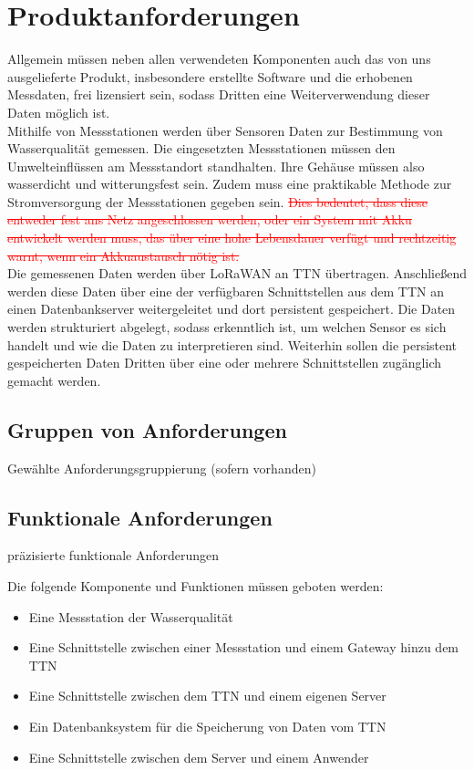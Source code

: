 \documentclass[
11pt,
a4paper,
ngerman,
]{article}
\newcommand{\commentKayo}[1]{\todo[size=\small,color=green!40,author=Kayo]{#1}}
\newcommand{\rem}[1]{\textcolor{red}{\sout{#1}}}
\newcommand{\descriptionWhat}[1]{%
	\begin{itshape}%
	#1 \\%
	\end{itshape}%
}
\begin{document}
\newpage

\section{Produktanforderungen}

Allgemein müssen neben allen verwendeten Komponenten auch das von uns ausgelieferte Produkt, insbesondere erstellte Software und die erhobenen Messdaten, frei lizensiert sein, sodass Dritten eine Weiterverwendung dieser Daten möglich ist.\\
Mithilfe von Messstationen werden über Sensoren Daten zur Bestimmung von Wasserqualität gemessen. Die eingesetzten Messstationen müssen den Umwelteinflüssen am Messstandort standhalten. Ihre Gehäuse müssen also wasserdicht und witterungsfest sein. Zudem muss eine praktikable Methode zur Stromversorgung der Messstationen gegeben sein. \commentKayo{Unnötig da wir das Festnetz benutzen}\rem{Dies bedeutet, dass diese entweder fest ans Netz angeschlossen werden, oder ein System mit Akku entwickelt werden muss, das über eine hohe Lebensdauer verfügt und rechtzeitig warnt, wenn ein Akkuaustausch nötig ist.}\\
Die gemessenen Daten werden über LoRaWAN an TTN übertragen. Anschließend werden diese Daten über eine der verfügbaren Schnittstellen aus dem TTN an einen Datenbankserver weitergeleitet und dort persistent gespeichert. Die Daten werden strukturiert abgelegt, sodass erkenntlich ist, um welchen Sensor es sich handelt und wie die Daten zu interpretieren sind. Weiterhin sollen die persistent gespeicherten Daten Dritten über eine oder mehrere Schnittstellen zugänglich gemacht werden.

\subsection{Gruppen von Anforderungen}

\descriptionWhat{Gewählte Anforderungsgruppierung (sofern vorhanden)}

\subsection{Funktionale Anforderungen}

\descriptionWhat{präzisierte funktionale Anforderungen}

Die folgende Komponente und Funktionen müssen geboten werden:

\begin{itemize}
	\item Eine Messstation der Wasserqualität
	\item Eine Schnittstelle zwischen einer Messstation und einem Gateway hinzu dem TTN
	\item Eine Schnittstelle zwischen dem TTN und einem eigenen Server
	\item Ein Datenbanksystem für die Speicherung von Daten vom TTN
	\item Eine Schnittstelle zwischen dem Server und einem Anwender
\end{itemize}
\end{document}
